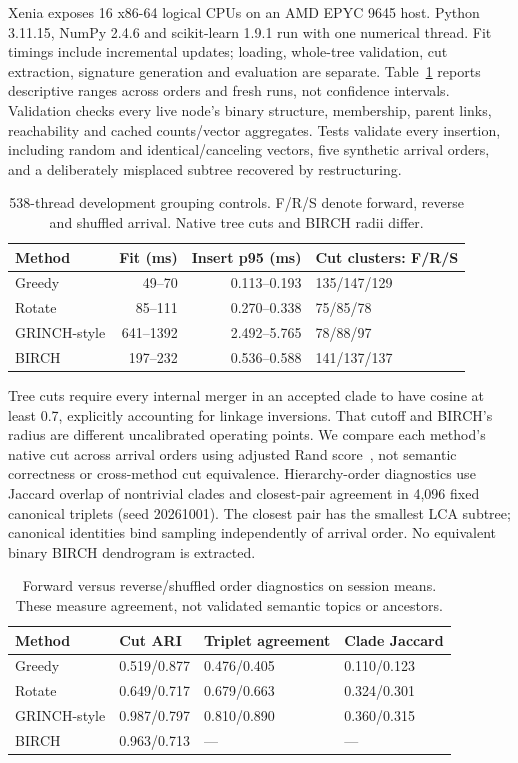 \documentclass[11pt]{article}
\begin{document}
Xenia exposes 16 x86-64 logical CPUs on an AMD EPYC 9645 host. Python 3.11.15,
NumPy 2.4.6 and scikit-learn 1.9.1 run with one numerical thread. Fit timings
include incremental updates; loading, whole-tree validation, cut extraction,
signature generation and evaluation are separate. Table~\ref{tab:online-cost}
reports descriptive ranges across orders and fresh runs, not confidence intervals.
Validation checks every live node's binary structure, membership, parent links,
reachability and cached counts/vector aggregates. Tests validate every insertion,
including random and identical/canceling vectors, five synthetic arrival orders,
and a deliberately misplaced subtree recovered by restructuring.

\begin{table}[ht]
\centering
\small
\begin{tabular}{lrrl}
\toprule
Method & Fit (ms) & Insert p95 (ms) & Cut clusters: F/R/S\\
\midrule
Greedy &49--70&0.113--0.193&135/147/129\\
Rotate &85--111&0.270--0.338&75/85/78\\
GRINCH-style &641--1392&2.492--5.765&78/88/97\\
BIRCH &197--232&0.536--0.588&141/137/137\\
\bottomrule
\end{tabular}
\caption{538-thread development grouping controls. F/R/S denote forward,
reverse and shuffled arrival. Native tree cuts and BIRCH radii differ.}
\label{tab:online-cost}
\end{table}

Tree cuts require every internal merger in an accepted clade to have cosine at
least 0.7, explicitly accounting for linkage inversions. That cutoff and BIRCH's
radius are different uncalibrated operating points. We compare each method's
native cut across arrival orders using adjusted Rand score~\cite{sklearn}, not
semantic correctness or cross-method cut equivalence. Hierarchy-order diagnostics
use Jaccard overlap of nontrivial clades and closest-pair agreement in 4,096 fixed
canonical triplets (seed 20261001). The closest pair has the smallest LCA subtree;
canonical identities bind sampling independently of arrival order. No equivalent
binary BIRCH dendrogram is extracted.

\begin{table}[ht]
\centering
\small
\begin{tabular}{llll}
\toprule
Method & Cut ARI & Triplet agreement & Clade Jaccard\\
\midrule
Greedy &0.519/0.877&0.476/0.405&0.110/0.123\\
Rotate &0.649/0.717&0.679/0.663&0.324/0.301\\
GRINCH-style &0.987/0.797&0.810/0.890&0.360/0.315\\
BIRCH &0.963/0.713&---&---\\
\bottomrule
\end{tabular}
\caption{Forward versus reverse/shuffled order diagnostics on session means.
These measure agreement, not validated semantic topics or ancestors.}
\label{tab:online-order}
\end{table}
\end{document}
